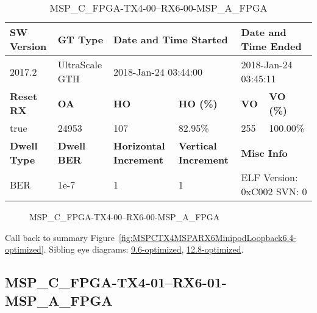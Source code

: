\begin{table}[h]
\centering
\caption{MSP\_C\_FPGA-TX4-00--RX6-00-MSP\_A\_FPGA}
\label{tab:MSPCFPGATX400RX600MSPAFPGA6.4-optimized}
\begin{tabular}{@{}|l|l|l|l|l|l|@{}}
\toprule
\textbf{SW Version}                & \textbf{GT Type}   & \multicolumn{2}{l|}{\textbf{Date and Time Started}}            & \multicolumn{2}{l|}{\textbf{Date and Time Ended}}        \\ \midrule
2017.2                       & UltraScale GTH          & \multicolumn{2}{l|}{2018-Jan-24 03:44:00}                   & \multicolumn{2}{l|}{2018-Jan-24 03:45:11}               \\ \midrule
\textbf{Reset RX}                  & \textbf{OA} & \textbf{HO}   & \textbf{HO (\%)} & \textbf{VO} & \textbf{VO (\%)} \\ \midrule
true & 24953        & 107          & 82.95\%        & 255        & 100.00\%       \\ \midrule
\textbf{Dwell Type}                & \textbf{Dwell BER} & \textbf{Horizontal Increment} & \textbf{Vertical Increment}    & \multicolumn{2}{l|}{\textbf{Misc Info}}                  \\ \midrule
BER                            & 1e-7        & 1        & 1           & \multicolumn{2}{l|}{ELF Version: 0xC002 SVN: 0}                         \\ \bottomrule
\end{tabular}
\end{table}

\begin{figure}[h]
\caption{MSP\_C\_FPGA-TX4-00--RX6-00-MSP\_A\_FPGA} \label{fig:MSPCFPGATX400RX600MSPAFPGA6.4-optimized}
\end{figure}

Call back to summary Figure~\ref{fig:MSPCTX4MSPARX6MinipodLoopback6.4-optimized}.
Sibling eye diagrams: \hyperref[sec:MSPCFPGATX400RX600MSPAFPGA9.6-optimized]{9.6-optimized}, \hyperref[sec:MSPCFPGATX400RX600MSPAFPGA12.8-optimized]{12.8-optimized}.

\clearpage
\newpage


\subsection{MSP\_C\_FPGA-TX4-01--RX6-01-MSP\_A\_FPGA}\label{sec:MSPCFPGATX401RX601MSPAFPGA6.4-optimized}

